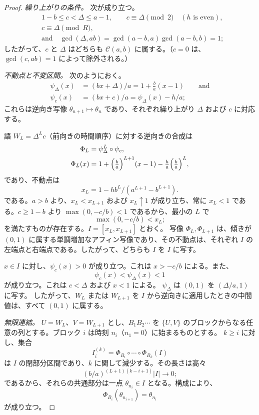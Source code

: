 \documentclass[11pt,reqno]{amsart}
\theoremstyle{definition}
\theoremstyle{definition}
\theoremstyle{remark}
\begin{document}
\begin{proof}\leavevmode\label{proof:42}
\emph{繰り上がりの条件。} 次が成り立つ。
\[
\begin{aligned}
&1-b\le c<\Delta\le a-1,\qquad c\equiv\Delta\pmod2\quad(h\text{ is even}),\\
&c\equiv\Delta\pmod R,\\
&\text{and}\quad\gcd(\Delta,ab)=\gcd(a-b,a)\gcd(a-b,b)=1;
\end{aligned}
\]
したがって、\(c\) と \(\Delta\) はどちらも \(\mathcal C(a,b)\) に属する。（\(c=0\) は、\(\gcd(c,ab)=1\) によって除外される。）

\emph{不動点と不変区間。} 次のようにおく。
\[
\begin{aligned}
\psi_\Delta(x)&=(bx+\Delta)/a=1+\tfrac ba(x-1)\qquad \text{and}\\
\psi_c(x)&=(bx+c)/a=\psi_\Delta(x)-h/a;
\end{aligned}
\]
これらは逆向き写像 \(\theta_{n+1}\mapsto\theta_n\) であり、それぞれ繰り上がり \(\Delta\) および \(c\) に対応する。

語 \(W_L=\Delta^Lc\)（前向きの時間順序）に対する逆向きの合成は
\[
\begin{aligned}
\Phi_L&=\psi_\Delta^L\circ\psi_c,\\
\Phi_L(x)&=1+\Bigl(\tfrac ba\Bigr)^{L+1}(x-1)-\tfrac ha\Bigl(\tfrac ba\Bigr)^L,
\end{aligned}
\]
であり、不動点は
\[
x_L=1-hb^L/(a^{L+1}-b^{L+1}).
\]
である。\(a>b\) より、\(x_L<x_{L+1}\) および \(x_L\uparrow1\) が成り立ち、常に \(x_L<1\) である。\(c\ge1-b\) より \(\max(0,-c/b)<1\) であるから、最小の \(L\) で
\[
\max(0,-c/b)<x_L;
\]
を満たすものが存在する。\(I=[x_L,x_{L+1}]\) とおく。
写像 \(\Phi_L,\Phi_{L+1}\) は、傾きが \((0,1)\) に属する単調増加なアフィン写像であり、その不動点は、それぞれ \(I\) の左端点と右端点である。したがって、どちらも \(I\) を \(I\) に写す。

\(x\in I\) に対し、\(\psi_c(x)>0\) が成り立つ。これは \(x>-c/b\) による。また、
\[
\psi_c(x)<\psi_\Delta(x)<1
\]
が成り立つ。これは \(c<\Delta\) および \(x<1\) による。
\(\psi_\Delta\) は \((0,1)\) を \((\Delta/a,1)\) に写す。
したがって、\(W_L\) または \(W_{L+1}\) を \(I\) から逆向きに適用したときの中間値は、すべて \((0,1)\) に属する。

\emph{無限連結。} \(U=W_L\)、\(V=W_{L+1}\) とし、\(B_1B_2\cdots\) を \(\{U,V\}\) のブロックからなる任意の列とする。ブロック \(i\) は時刻 \(n_i\)（\(n_1=0\)）に始まるものとする。
\(k\ge i\) に対し、集合
\[
I_i^{(k)}=\Phi_{B_i}\circ\cdots\circ\Phi_{B_k}(I)
\]
は \(I\) の閉部分区間であり、\(k\) に関して減少する。その長さは高々
\[
(b/a)^{(L+1)(k-i+1)}|I|\to0;
\]
であるから、それらの共通部分は一点 \(\theta_{n_i}\in I\) となる。構成により、
\[
\Phi_{B_i}(\theta_{n_{i+1}})=\theta_{n_i}
\]
が成り立つ。


\end{proof}
\end{document}
